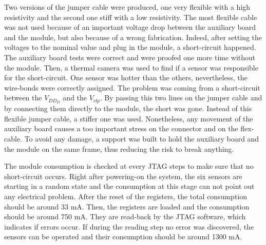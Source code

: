   Two versions of the jumper cable were produced, one very flexible with a high resistivity and the second one stiff with a low resistivity.
  The most flexible cable was not used because of an important voltage drop between the auxiliary board and the module, but also because of a wrong fabrication.
  Indeed, after setting the voltages to the nominal value and plug in the module, a short-circuit happened.
  The auxiliary board tests were correct and were proofed one more time without the module.
  Then, a thermal camera was used to find if a sensor was responsible for the short-circuit.
  One sensor was hotter than the others, nevertheless, the wire-bonds were correctly assigned.
  The problem was coming from a short-circuit between the $V_{DD_D}$ and the $V_{clp}$.
  By passing this two lines on the jumper cable and by connecting them directly to the module, the short was gone.
  Instead of this flexible jumper cable, a stiffer one was used.
  Nonetheless, any movement of the auxiliary board causes a too important stress on the connector and on the flex-cable.
  To avoid any damage, a support was built to hold the auxiliary board and the module on the same frame, thus reducing the risk to break anything.

  The module consumption is checked at every JTAG steps to make sure that no short-circuit occurs.
  Right after powering-on the system, the six sensors are starting in a random state and the consumption at this stage can not point out any electrical problem.
  After the reset of the registers, the total consumption should be around 33 mA.
  Then, the registers are loaded and the consumption should be around 750 mA.
  They are read-back by the JTAG software, which indicates if errors occur.
  If during the reading step no error was discovered, the sensors can be operated and their consumption should be around 1300 mA.



